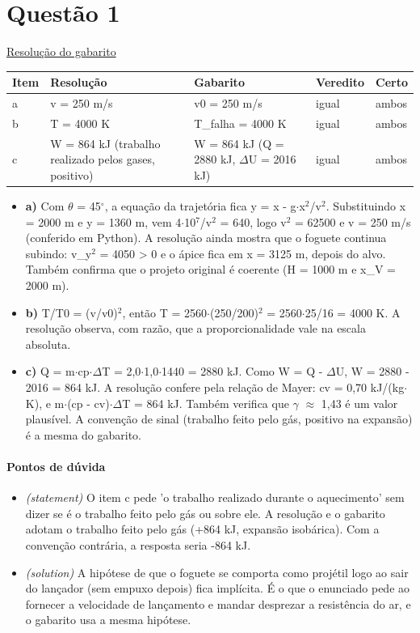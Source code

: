 \documentclass{article}%
\begin{document}
\section*{Questão 1}%
\href{https://poliedroresolve.sistemapoliedro.com.br/vestibulares/ime/2027/ime-2-fase-dia-2-27-10-2026-2-fase-dia-2/dissertativa-1-fisica-2-fase-dia-2-ime-2027}{Resolução do gabarito}\par\smallskip%
\begin{longtable}{@{}p{} p{} p{} p{} p{}@{}}\toprule Item & Resolução & Gabarito & Veredito & Certo \\ \midrule
a & v = 250 m/s & v0 = 250 m/s & igual & ambos \\
b & T = 4000 K & T\_falha = 4000 K & igual & ambos \\
c & W = 864 kJ (trabalho realizado pelos gases, positivo) & W = 864 kJ (Q = 2880 kJ, $\Delta$U = 2016 kJ) & igual & ambos \\
\bottomrule\end{longtable}%
\begin{itemize}%
\item%
\textbf{a)} Com $\theta$ = 45$^\circ$, a equação da trajetória fica y = x - g$\cdot$x$^2$/v$^2$. Substituindo x = 2000 m e y = 1360 m, vem 4$\cdot$10$^{7}$/v$^2$ = 640, logo v$^2$ = 62500 e v = 250 m/s (conferido em Python). A resolução ainda mostra que o foguete continua subindo: v\_y$^2$ = 4050 > 0 e o ápice fica em x = 3125 m, depois do alvo. Também confirma que o projeto original é coerente (H = 1000 m e x\_V = 2000 m).%
\item%
\textbf{b)} T/T0 = (v/v0)$^2$, então T = 2560$\cdot$(250/200)$^2$ = 2560$\cdot$25/16 = 4000 K. A resolução observa, com razão, que a proporcionalidade vale na escala absoluta.%
\item%
\textbf{c)} Q = m$\cdot$cp$\cdot$$\Delta$T = 2,0$\cdot$1,0$\cdot$1440 = 2880 kJ. Como W = Q - $\Delta$U, W = 2880 - 2016 = 864 kJ. A resolução confere pela relação de Mayer: cv = 0,70 kJ/(kg$\cdot$K), e m$\cdot$(cp - cv)$\cdot$$\Delta$T = 864 kJ. Também verifica que $\gamma$ $\approx$ 1,43 é um valor plausível. A convenção de sinal (trabalho feito pelo gás, positivo na expansão) é a mesma do gabarito.%
\end{itemize}%
\paragraph{Pontos de dúvida}%
\begin{itemize}%
\item%
\textit{(statement)} O item c pede 'o trabalho realizado durante o aquecimento' sem dizer se é o trabalho feito pelo gás ou sobre ele. A resolução e o gabarito adotam o trabalho feito pelo gás (+864 kJ, expansão isobárica). Com a convenção contrária, a resposta seria -864 kJ.%
\item%
\textit{(solution)} A hipótese de que o foguete se comporta como projétil logo ao sair do lançador (sem empuxo depois) fica implícita. É o que o enunciado pede ao fornecer a velocidade de lançamento e mandar desprezar a resistência do ar, e o gabarito usa a mesma hipótese.%
\end{itemize}%
\end{document}
